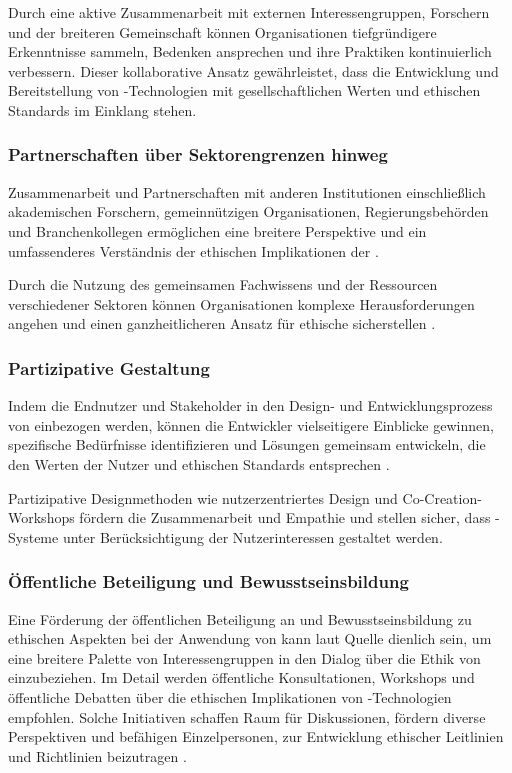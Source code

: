 \documentclass[hidelinks,12pt]{report}
\begin{document}
Durch eine aktive Zusammenarbeit mit externen Interessengruppen, Forschern und der breiteren Gemeinschaft können Organisationen tiefgründigere Erkenntnisse sammeln, Bedenken ansprechen und ihre Praktiken kontinuierlich verbessern. Dieser kollaborative Ansatz gewährleistet, dass die Entwicklung und Bereitstellung von  -Technologien mit gesellschaftlichen Werten und ethischen Standards im Einklang stehen.

\subsubsection{Partnerschaften über Sektorengrenzen hinweg}
Zusammenarbeit und Partnerschaften mit anderen Institutionen einschließlich akademischen Forschern, gemeinnützigen Organisationen, Regierungsbehörden und Branchenkollegen ermöglichen eine breitere Perspektive und ein umfassenderes Verständnis der ethischen Implikationen der  \cite{Vogel}. 

Durch die Nutzung des gemeinsamen Fachwissens und der Ressourcen verschiedener Sektoren können Organisationen komplexe Herausforderungen angehen und einen ganzheitlicheren Ansatz für ethische  sicherstellen \cite{Vogel}.

\subsubsection{Partizipative Gestaltung}
Indem die Endnutzer und Stakeholder in den Design- und Entwicklungsprozess von   einbezogen werden, können die Entwickler vielseitigere Einblicke gewinnen, spezifische Bedürfnisse identifizieren und Lösungen gemeinsam entwickeln, die den Werten der Nutzer und ethischen Standards entsprechen \cite{Zytko}. 

Partizipative Designmethoden wie nutzerzentriertes Design und Co-Creation-Workshops fördern die Zusammenarbeit und Empathie und stellen sicher, dass -Systeme unter Berücksichtigung der Nutzerinteressen gestaltet werden.

\subsubsection{Öffentliche Beteiligung und Bewusstseinsbildung}
Eine Förderung der öffentlichen Beteiligung an und Bewusstseinsbildung zu ethischen Aspekten bei der Anwendung von  kann laut Quelle \cite{WILSON2022101652} dienlich sein, um eine breitere Palette von Interessengruppen in den Dialog über die Ethik von  einzubeziehen. Im Detail werden öffentliche Konsultationen, Workshops und öffentliche Debatten über die ethischen Implikationen von -Technologien empfohlen. Solche Initiativen schaffen Raum für Diskussionen, fördern diverse Perspektiven und befähigen Einzelpersonen, zur Entwicklung ethischer Leitlinien und Richtlinien beizutragen \cite{WILSON2022101652}.
\end{document}

